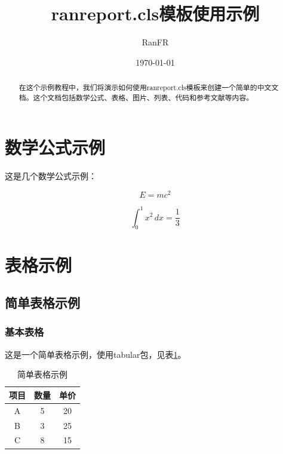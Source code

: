 \documentclass[]{ranreport} %
\title{ranreport.cls模板使用示例}
\author{RanFR}
\date{\today}
\begin{document}
\maketitle

\begin{abstract}
    在这个示例教程中，我们将演示如何使用ranreport.cls模板来创建一个简单的中文文档。这个文档包括数学公式、表格、图片、列表、代码和参考文献等内容。
\end{abstract}

\section{数学公式示例}

这是几个数学公式示例：

\begin{equation}
    E = mc^2
\end{equation}

\begin{equation}
    \int_0^1 x^2 \, dx = \frac{1}{3}
\end{equation}

\section{表格示例}

\subsection{简单表格示例}

\subsubsection{基本表格}

这是一个简单表格示例，使用tabular包，见表\ref{tab:basic_tabular_table}。

\begin{table}[htbp]
    \centering
    \caption{简单表格示例}
    \label{tab:basic_tabular_table}
    \begin{tabular}{|c|c|c|}
        \hline
        项目 & 数量 & 单价 \\
        \hline
        A    & 5    & 20   \\
        B    & 3    & 25   \\
        C    & 8    & 15   \\
        \hline
    \end{tabular}
\end{table}
\end{document}
